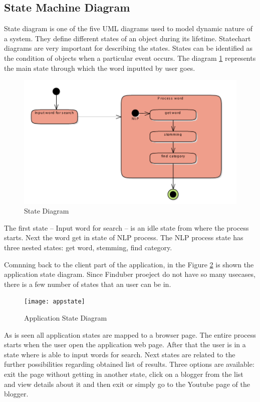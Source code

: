 \subsection{State Machine Diagram}

State diagram is one of the five UML diagrams used to model dynamic nature of a system. They define different states of an object during its lifetime. Statechart diagrams are very important for describing the states. States can be identified as the condition of objects when a particular event occurs. The diagram \ref{state_uml} represents the main state through which the word inputted by user goes. 

\begin{figure}[!ht]
\centering
\includegraphics[width=15cm]{wordstate}
\caption{State Diagram}\label{state_uml}
\end{figure}

The first state -- Input word for search -- is an idle state from where the process starts. Next the word get in state of NLP process. The NLP process state has three nested states: get word, stemming, find category. 

Comnning back to the client part of the application, in the Figure \ref{appstates} is shown the application state diagram. Since Finduber proeject do not have so many usecases, there is a few number of states that an user can be in.

\begin{figure}[!ht]
\centering
\texttt{[image: appstate]}
\caption{Application State Diagram}\label{appstates}
\end{figure}

As is seen all application states are mapped to a browser page. The entire process starts when the user open the application web page. After that the user is in a state where is able to input words for search. Next states are related to the further possibilities regarding obtained list of results. Three options are available: exit the page without getting in another state, click on a blogger from the list and view details about it and then exit or simply go to the Youtube page of the blogger.

